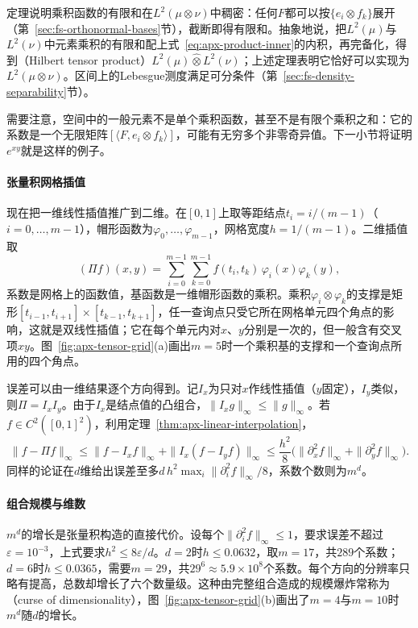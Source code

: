 定理说明乘积函数的有限和在$L^2(\mu\otimes\nu)$中稠密：任何$F$都可以按$\{e_i\otimes f_k\}$展开（第~\ref{sec:fs-orthonormal-bases}节），截断即得有限和。抽象地说，把$L^2(\mu)$与$L^2(\nu)$中元素乘积的有限和配上式~\eqref{eq:apx-product-inner}的内积，再完备化，得到（Hilbert tensor product）$L^2(\mu)\mathbin{\hat\otimes}L^2(\nu)$；上述定理表明它恰好可以实现为$L^2(\mu\otimes\nu)$。区间上的Lebesgue测度满足可分条件（第~\ref{sec:fs-density-separability}节）。

需要注意，空间中的一般元素不是单个乘积函数，甚至不是有限个乘积之和：它的系数是一个无限矩阵$[\langle F,e_i\otimes f_k\rangle]$，可能有无穷多个非零奇异值。下一小节将证明$e^{xy}$就是这样的例子。

\paragraph{张量积网格插值}

现在把一维线性插值推广到二维。在$[0,1]$上取等距结点$t_i=i/(m-1)$（$i=0,\ldots,m-1$），帽形函数为$\varphi_0,\ldots,\varphi_{m-1}$，网格宽度$h=1/(m-1)$。二维插值取
\[
  (\Pi f)(x,y)=\sum_{i=0}^{m-1}\sum_{k=0}^{m-1}f(t_i,t_k)\,\varphi_i(x)\varphi_k(y),
\]
系数是网格上的函数值，基函数是一维帽形函数的乘积。乘积$\varphi_i\otimes\varphi_k$的支撑是矩形$[t_{i-1},t_{i+1}]\times[t_{k-1},t_{k+1}]$，任一查询点只受它所在网格单元四个角点的影响，这就是双线性插值；它在每个单元内对$x$、$y$分别是一次的，但一般含有交叉项$xy$。图~\ref{fig:apx-tensor-grid}(a)画出$m=5$时一个乘积基的支撑和一个查询点所用的四个角点。

误差可以由一维结果逐个方向得到。记$I_x$为只对$x$作线性插值（$y$固定），$I_y$类似，则$\Pi=I_xI_y$。由于$I_x$是结点值的凸组合，$\|I_xg\|_\infty\le\|g\|_\infty$。若$f\in C^2([0,1]^2)$，利用定理~\ref{thm:apx-linear-interpolation}，
\[
  \|f-\Pi f\|_\infty\le\|f-I_xf\|_\infty+\|I_x(f-I_yf)\|_\infty
  \le\frac{h^2}{8}\bigl(\|\partial_x^2f\|_\infty+\|\partial_y^2f\|_\infty\bigr).
\]
同样的论证在$d$维给出误差至多$d\,h^2\max_i\|\partial_i^2f\|_\infty/8$，系数个数则为$m^d$。

\paragraph{组合规模与维数}

$m^d$的增长是张量积构造的直接代价。设每个$\|\partial_i^2f\|_\infty\le1$，要求误差不超过$\varepsilon=10^{-3}$，上式要求$h^2\le8\varepsilon/d$。$d=2$时$h\le0.0632$，取$m=17$，共$289$个系数；$d=6$时$h\le0.0365$，需要$m=29$，共$29^6\approx5.9\times10^8$个系数。每个方向的分辨率只略有提高，总数却增长了六个数量级。这种由完整组合造成的规模爆炸常称为（curse of dimensionality），图~\ref{fig:apx-tensor-grid}(b)画出了$m=4$与$m=10$时$m^d$随$d$的增长。

